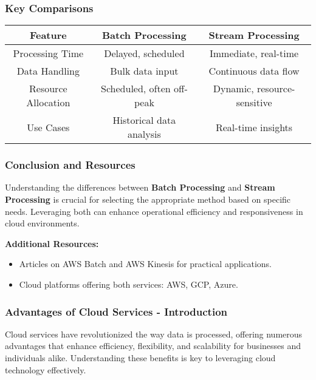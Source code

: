 \documentclass{beamer}
\begin{document}
\begin{frame}[fragile]
    \frametitle{Key Comparisons}
    \begin{center}
        \begin{tabular}{|c|c|c|}
            \hline
            \textbf{Feature} & \textbf{Batch Processing} & \textbf{Stream Processing} \\
            \hline
            Processing Time & Delayed, scheduled & Immediate, real-time \\
            \hline
            Data Handling & Bulk data input & Continuous data flow \\
            \hline
            Resource Allocation & Scheduled, often off-peak & Dynamic, resource-sensitive \\
            \hline
            Use Cases & Historical data analysis & Real-time insights \\
            \hline
        \end{tabular}
    \end{center}
\end{frame}

\begin{frame}[fragile]
    \frametitle{Conclusion and Resources}
    Understanding the differences between \textbf{Batch Processing} and \textbf{Stream Processing} is crucial for selecting the appropriate method based on specific needs. Leveraging both can enhance operational efficiency and responsiveness in cloud environments.
    
    \textbf{Additional Resources:}
    \begin{itemize}
        \item Articles on AWS Batch and AWS Kinesis for practical applications.
        \item Cloud platforms offering both services: AWS, GCP, Azure.
    \end{itemize}
\end{frame}

\begin{frame}[fragile]
    \frametitle{Advantages of Cloud Services - Introduction}
    Cloud services have revolutionized the way data is processed, offering numerous advantages that enhance efficiency, flexibility, and scalability for businesses and individuals alike. Understanding these benefits is key to leveraging cloud technology effectively.
\end{frame}
\end{document}
